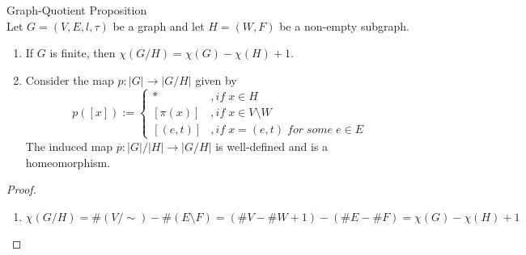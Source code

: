 \begin{proposition}{Graph-Quotient Proposition}\\
Let $G= (V,E,l,\tau)$ be a graph and let $H=(W,F)$ be a non-empty subgraph.
\begin{enumerate}
    \item If $G$ is finite, then $\chi(G/H) = \chi(G) -\chi (H) +1$.
    \item Consider the map $p: |G| \to |G/H|$ given by
    $$p([x]) := \begin{cases}
        * &,if\; x\in H\\
        [\pi(x)] &,if\; x \in V \setminus W\\
        [(e,t)] &,if\; x=(e,t)\;for\;some\;e \in E
    \end{cases}$$
    The induced map $\overline{p}: |G|/|H| \to |G/H|$ is well-defined and is a homeomorphism.
\end{enumerate}
\end{proposition}

\begin{proof}
    \begin{enumerate}
        \item $$\chi (G/H) = \# (V/\sim) - \#(E \setminus F) = (\#V - \#W +1) - (\#E-\#F) = \chi(G) -\chi(H)+1$$
    \end{enumerate}
\end{proof}